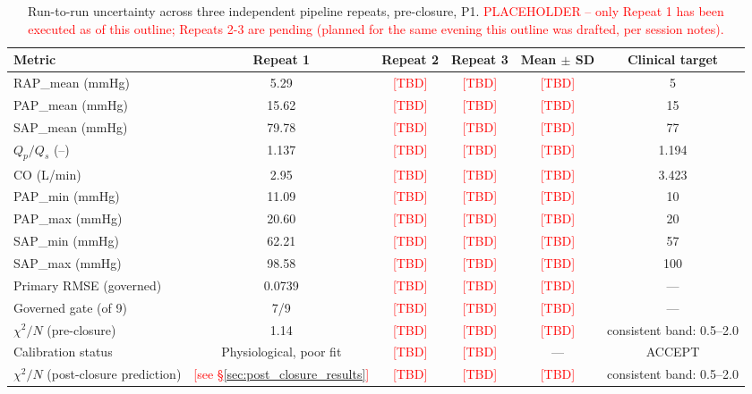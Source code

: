 \documentclass{article}
\begin{document}
\begin{table}[ht]
\centering
\caption{Run-to-run uncertainty across three independent pipeline repeats, pre-closure, P1. \textcolor{red}{PLACEHOLDER -- only Repeat 1 has been executed as of this outline; Repeats 2-3 are pending (planned for the same evening this outline was drafted, per session notes).}}
\label{tab:uncertainty}
\begin{tabular}{lccccc}
\toprule
\textbf{Metric} & \textbf{Repeat 1} & \textbf{Repeat 2} & \textbf{Repeat 3} & \textbf{Mean $\pm$ SD} & \textbf{Clinical target} \\
\midrule
RAP\_mean (mmHg)        & 5.29  & \textcolor{red}{[TBD]} & \textcolor{red}{[TBD]} & \textcolor{red}{[TBD]} & 5 \\
PAP\_mean (mmHg)        & 15.62 & \textcolor{red}{[TBD]} & \textcolor{red}{[TBD]} & \textcolor{red}{[TBD]} & 15 \\
SAP\_mean (mmHg)        & 79.78 & \textcolor{red}{[TBD]} & \textcolor{red}{[TBD]} & \textcolor{red}{[TBD]} & 77 \\
$Q_p/Q_s$ (--)          & 1.137 & \textcolor{red}{[TBD]} & \textcolor{red}{[TBD]} & \textcolor{red}{[TBD]} & 1.194 \\
CO (L/min)              & 2.95  & \textcolor{red}{[TBD]} & \textcolor{red}{[TBD]} & \textcolor{red}{[TBD]} & 3.423 \\
PAP\_min (mmHg)         & 11.09 & \textcolor{red}{[TBD]} & \textcolor{red}{[TBD]} & \textcolor{red}{[TBD]} & 10 \\
PAP\_max (mmHg)         & 20.60 & \textcolor{red}{[TBD]} & \textcolor{red}{[TBD]} & \textcolor{red}{[TBD]} & 20 \\
SAP\_min (mmHg)         & 62.21 & \textcolor{red}{[TBD]} & \textcolor{red}{[TBD]} & \textcolor{red}{[TBD]} & 57 \\
SAP\_max (mmHg)         & 98.58 & \textcolor{red}{[TBD]} & \textcolor{red}{[TBD]} & \textcolor{red}{[TBD]} & 100 \\
\midrule
Primary RMSE (governed) & 0.0739 & \textcolor{red}{[TBD]} & \textcolor{red}{[TBD]} & \textcolor{red}{[TBD]} & --- \\
Governed gate (of 9)    & 7/9    & \textcolor{red}{[TBD]} & \textcolor{red}{[TBD]} & \textcolor{red}{[TBD]} & --- \\
$\chi^2/N$ (pre-closure) & 1.14  & \textcolor{red}{[TBD]} & \textcolor{red}{[TBD]} & \textcolor{red}{[TBD]} & consistent band: 0.5--2.0 \\
Calibration status      & Physiological, poor fit & \textcolor{red}{[TBD]} & \textcolor{red}{[TBD]} & --- & ACCEPT \\
$\chi^2/N$ (post-closure prediction) & \textcolor{red}{[see \S\ref{sec:post_closure_results}]} & \textcolor{red}{[TBD]} & \textcolor{red}{[TBD]} & \textcolor{red}{[TBD]} & consistent band: 0.5--2.0 \\
\bottomrule
\end{tabular}
\end{table}
\end{document}
